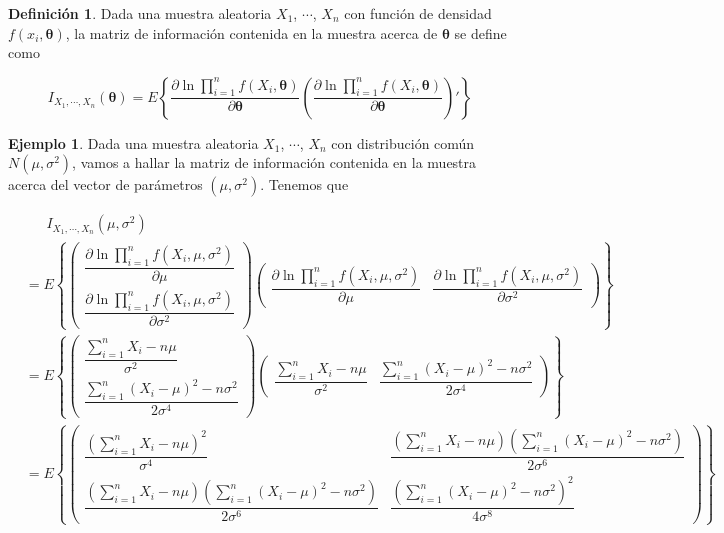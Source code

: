 \documentclass[
  10pt,
  spanish,
]{book}
\theoremstyle{definition}
\newtheorem{definition}{Definición}[chapter]
\theoremstyle{definition}
\newtheorem{example}{Ejemplo}[chapter]
\theoremstyle{definition}
\theoremstyle{definition}
\theoremstyle{remark}
\begin{document}
\begin{definition}
\protect\hypertarget{def:unnamed-chunk-8}{}{\label{def:unnamed-chunk-8} }Dada una muestra aleatoria \(X_1\), \(\cdots\), \(X_n\) con función de densidad \(f(x_i,\boldsymbol \theta)\), la matriz de información contenida en la muestra acerca de \(\boldsymbol \theta\) se define como

\begin{equation*}
I_{X_1,\cdots,X_n}(\boldsymbol \theta)=E\left\{\frac{\partial\ln \prod_{i=1}^nf(X_i,\boldsymbol \theta)}{\partial\boldsymbol \theta}\left(\frac{\partial\ln \prod_{i=1}^nf(X_i,\boldsymbol \theta)}{\partial\boldsymbol \theta}\right)'\right\}
\end{equation*}
\end{definition}

\begin{example}
\protect\hypertarget{exm:unnamed-chunk-9}{}{\label{exm:unnamed-chunk-9} }Dada una muestra aleatoria \(X_1\), \(\cdots\), \(X_n\) con distribución común \(N(\mu,\sigma^2)\), vamos a hallar la matriz de información contenida en la muestra acerca del vector de parámetros \((\mu,\sigma^2)\). Tenemos que

\begin{align*}
&\ \ \ \ \ \ \ I_{X_1,\cdots,X_n}(\mu,\sigma^2)\\
&=E\left\{
\begin{pmatrix}
\dfrac{\partial\ln \prod_{i=1}^nf(X_i,\mu,\sigma^2)}{\partial\mu}\\
\dfrac{\partial\ln \prod_{i=1}^nf(X_i,\mu,\sigma^2)}{\partial\sigma^2}
\end{pmatrix}
\begin{pmatrix}
\dfrac{\partial\ln \prod_{i=1}^nf(X_i,\mu,\sigma^2)}{\partial\mu}&
\dfrac{\partial\ln \prod_{i=1}^nf(X_i,\mu,\sigma^2)}{\partial\sigma^2}
\end{pmatrix}
\right\}\\
&=E\left\{
\begin{pmatrix}
\dfrac{\sum_{i=1}^nX_i-n\mu}{\sigma^2}\\
\dfrac{\sum_{i=1}^n(X_i-\mu)^2-n\sigma^2}{2\sigma^4}
\end{pmatrix}
\begin{pmatrix}
\dfrac{\sum_{i=1}^nX_i-n\mu}{\sigma^2}&
\dfrac{\sum_{i=1}^n(X_i-\mu)^2-n\sigma^2}{2\sigma^4}
\end{pmatrix}
\right\}\\
&=E\left\{\begin{pmatrix}
\dfrac{(\sum_{i=1}^nX_i-n\mu)^2}{\sigma^4}&\dfrac{(\sum_{i=1}^nX_i-n\mu)(\sum_{i=1}^n(X_i-\mu)^2-n\sigma^2)}{2\sigma^6}\\
\dfrac{(\sum_{i=1}^nX_i-n\mu)(\sum_{i=1}^n(X_i-\mu)^2-n\sigma^2)}{2\sigma^6}&\dfrac{(\sum_{i=1}^n(X_i-\mu)^2-n\sigma^2)^2}{4\sigma^8}
\end{pmatrix}\right\}
\end{align*}


\end{example}
\end{document}

